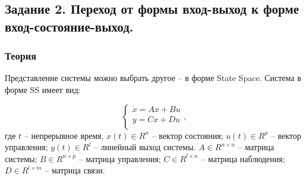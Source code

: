\documentclass[16pt]{article}
\begin{document}
\newpage
\subsection{Задание 2. Переход от формы вход-выход к форме вход-состояние-выход.}
\subsubsection{Теория}
Представление системы можно выбрать другое -- в форме State Space. Система в форме SS имеет вид:

\[ 
    \begin{cases}
        \dot{x} = Ax + Bu \\
        y = Cx + Du \\
    \end{cases},
\]
где \( t \) -- непрерывное время, \(x(t) \in R^n\) -- вектор состояния; \(u(t) \in R^p\) -- вектор управления; \(y(t) \in R^l\) -- линейный выход системы.
\( A \in R^{n \times n}\) -- матрица системы; \( B \in R^{n \times p}\) -- матрица управления; \( C \in R^{l \times n}\) -- матрица наблюдения; \( D \in R^{l \times m}\) -- матрица связи. \\
\end{document}
